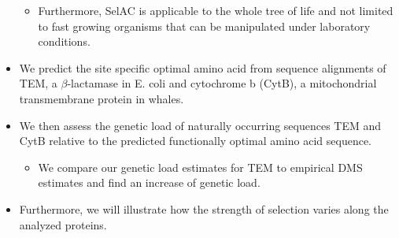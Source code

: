 \documentclass[12pt]{article}
\begin{document}
\begin{itemize}
\begin{itemize}
		\item Furthermore, SelAC is applicable to the whole tree of life and not limited to fast growing organisms that can be manipulated under laboratory conditions.
	\end{itemize}
	\item We predict the site specific optimal amino acid from sequence alignments of TEM, a $\beta$-lactamase in E. coli and cytochrome b (CytB), a mitochondrial transmembrane protein in whales.
	\item We then assess the genetic load of naturally occurring sequences TEM and CytB relative to the predicted functionally optimal amino acid sequence.
	\begin{itemize}
		\item We compare our genetic load estimates for TEM to empirical DMS estimates and find an increase of genetic load.
	\end{itemize}
	\item Furthermore, we will illustrate how the strength of selection varies along the analyzed proteins.
\end{itemize}
\end{document}
